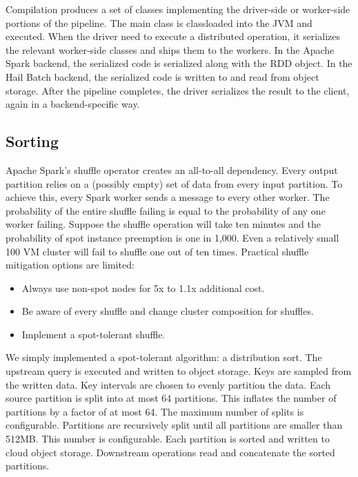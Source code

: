 \documentclass[sigconf, nonacm]{acmart}
\begin{document}
Compilation produces a set of classes implementing the driver-side or worker-side portions of the
pipeline. The main class is classloaded into the JVM and executed. When the driver need to execute a
distributed operation, it serializes the relevant worker-side classes and ships them to the
workers. In the Apache Spark backend, the serialized code is serialized along with the RDD
object. In the Hail Batch backend, the serialized code is written to and read from object
storage. After the pipeline completes, the driver serializes the result to the client, again in a
backend-specific way.

\subsection{Sorting}

Apache Spark’s shuffle operator creates an all-to-all dependency. Every output partition relies on a
(possibly empty) set of data from every input partition. To achieve this, every Spark worker sends a
message to every other worker. The probability of the entire shuffle failing is equal to the
probability of any one worker failing. Suppose the shuffle operation will take ten minutes and the
probability of spot instance preemption is one in 1,000. Even a relatively small 100 VM cluster will
fail to shuffle one out of ten times. Practical shuffle mitigation options are limited:

\begin{itemize}
\item Always use non-spot nodes for 5x to 1.1x additional cost.
\item Be aware of every shuffle and change cluster composition for shuffles.
\item Implement a spot-tolerant shuffle.
\end{itemize}

We simply implemented a spot-tolerant algorithm: a distribution sort. The upstream query is executed
and written to object storage. Keys are sampled from the written data. Key intervals are chosen to
evenly partition the data. Each source partition is split into at most 64 partitions. This inflates
the number of partitions by a factor of at most 64. The maximum number of splits is
configurable. Partitions are recursively split until all partitions are smaller than 512MB. This
number is configurable. Each partition is sorted and written to cloud object storage. Downstream
operations read and concatenate the sorted partitions.
\end{document}

